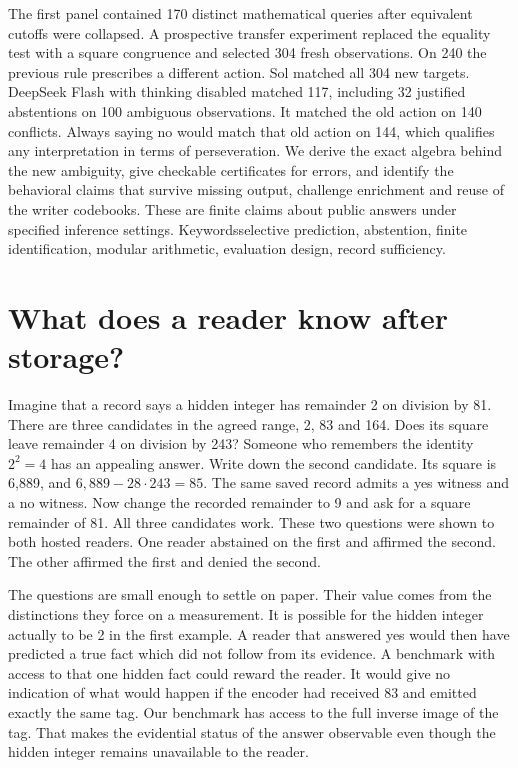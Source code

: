 \documentclass[12pt,letterpaper]{article}
\begin{document}
The first panel contained 170 distinct mathematical queries after equivalent cutoffs were collapsed. A prospective transfer experiment replaced the equality test with a square congruence and selected 304 fresh observations. On 240 the previous rule prescribes a different action. Sol matched all 304 new targets. DeepSeek Flash with thinking disabled matched 117, including 32 justified abstentions on 100 ambiguous observations. It matched the old action on 140 conflicts. Always saying no would match that old action on 144, which qualifies any interpretation in terms of perseveration. We derive the exact algebra behind the new ambiguity, give checkable certificates for errors, and identify the behavioral claims that survive missing output, challenge enrichment and reuse of the writer codebooks. These are finite claims about public answers under specified inference settings.
\vspace{0.2in}
{\small\textsf{Keywords}\quad selective prediction, abstention, finite identification, modular arithmetic, evaluation design, record sufficiency.}
\clearpage\tableofcontents\clearpage{}
\section{What does a reader know after storage?}\label{sec:intro}
Imagine that a record says a hidden integer has remainder 2 on division by 81. There are three candidates in the agreed range, 2, 83 and 164. Does its square leave remainder 4 on division by 243? Someone who remembers the identity $2^2=4$ has an appealing answer. Write down the second candidate. Its square is 6,889, and $6,889-28\cdot243=85$. The same saved record admits a yes witness and a no witness. Now change the recorded remainder to 9 and ask for a square remainder of 81. All three candidates work. These two questions were shown to both hosted readers. One reader abstained on the first and affirmed the second. The other affirmed the first and denied the second.

The questions are small enough to settle on paper. Their value comes from the distinctions they force on a measurement. It is possible for the hidden integer actually to be 2 in the first example. A reader that answered yes would then have predicted a true fact which did not follow from its evidence. A benchmark with access to that one hidden fact could reward the reader. It would give no indication of what would happen if the encoder had received 83 and emitted exactly the same tag. Our benchmark has access to the full inverse image of the tag. That makes the evidential status of the answer observable even though the hidden integer remains unavailable to the reader.
\end{document}
